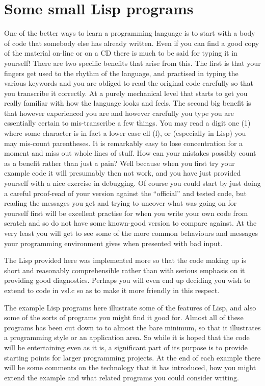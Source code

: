 \chapter{Some small Lisp programs}
One of the better ways to learn a programming language is to start with a
body of code that somebody else has already written. Even if you can find
a good copy of the material on-line or on a CD there is much to be said for
typing it in yourself! There are two specific benefits that arise from this.
The first is that your fingers get used to the rhythm of the language, and
practised in typing the various keywords and you are obliged to read the
original code carefully so that you transcribe it correctly. At a purely
mechanical level that starts to get you really familiar with how the language
looks and feels. The second big benefit is that however experienced you are
and however carefully you type you are essentially certain to mis-transcribe
a few things. You may read a digit one (1) where some character is in fact a
lower case ell (l), or (especially in Lisp) you may mis-count parentheses.
It is remarkably easy to lose concentration for a moment and miss out whole
lines of stuff. How can your mistakes possibly count as a benefit rather
than just a pain? Well because when you first try your example code it
will presumably then not work, and you have just provided yourself with
a nice exercise in debugging. Of course you could start by just doing a
careful proof-read of your version against the ``official'' and tested code,
but reading the messages you get and trying to uncover what was going on
for yourself first will be excellent practise for when you write your own
code from scratch and so do not have some known-good version to compare
against. At the very least you will get to see some of the more common
behaviours and messages your programming environment gives when presented
with bad input. 

The Lisp provided here was implemented more so that the
code making up \vsl{} is short and reasonably comprehensible rather than
with serious emphasis on it providing good diagnostics. Perhaps you will
even end up deciding you wish to extend to code in {\tx vsl.c} so as
to make it more friendly in this respect.

The example Lisp programs here illustrate some of the features of Lisp, and
also some of the sorts of programs you might find it good for. Almost all
of these programs has been cut down to to almost the bare minimum, so that
it illustrates a programming style or an application area. So while it is
hoped that the code will be entertaining even as it is, a significant part
of its purpose is to provide starting points for larger programming
projects. At the end of each example there will be some comments on
the technology that it has introduced, how you might extend the example
and what related programs you could consider writing.

